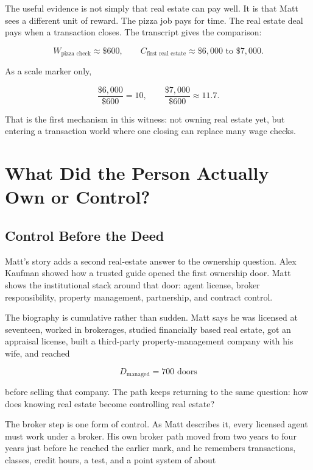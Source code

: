 \documentclass[11pt,oneside]{book}
\begin{document}
The useful evidence is not simply that real estate can pay well. It is that Matt sees a different unit of reward. The pizza job pays for time. The real estate deal pays when a transaction closes. The transcript gives the comparison:

\begin{equation}
W_{\text{pizza check}}\approx \$600,
\qquad
C_{\text{first real estate}}\approx \$6{,}000\text{ to }\$7{,}000.
\end{equation}

As a scale marker only,

\begin{equation}
\frac{\$6{,}000}{\$600}=10,
\qquad
\frac{\$7{,}000}{\$600}\approx 11.7.
\end{equation}

That is the first mechanism in this witness: not owning real estate yet, but entering a transaction world where one closing can replace many wage checks.

\chapter{What Did the Person Actually Own or Control?}

\section{Control Before the Deed}

Matt's story adds a second real-estate answer to the ownership question. Alex Kaufman showed how a trusted guide opened the first ownership door. Matt shows the institutional stack around that door: agent license, broker responsibility, property management, partnership, and contract control.

The biography is cumulative rather than sudden. Matt says he was licensed at seventeen, worked in brokerages, studied financially based real estate, got an appraisal license, built a third-party property-management company with his wife, and reached

\begin{equation}
D_{\text{managed}}=700\text{ doors}
\end{equation}

before selling that company. The path keeps returning to the same question: how does knowing real estate become controlling real estate?

The broker step is one form of control. As Matt describes it, every licensed agent must work under a broker. His own broker path moved from two years to four years just before he reached the earlier mark, and he remembers transactions, classes, credit hours, a test, and a point system of about
\end{document}
